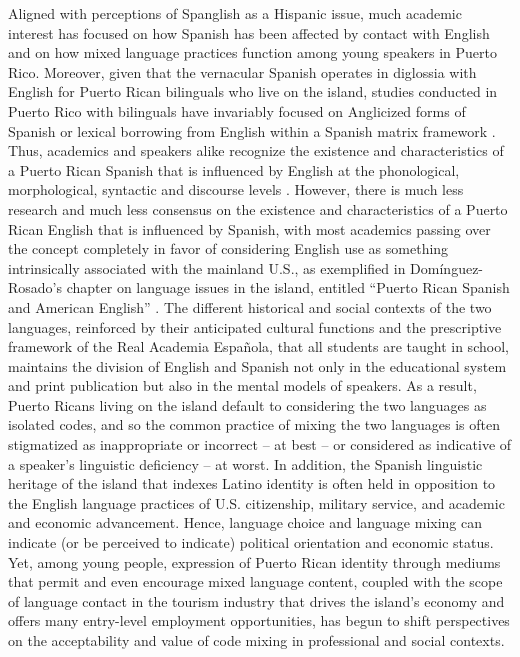 \documentclass[output=paper,colorlinks,citecolor=brown]{langscibook}
\begin{document}
Aligned with perceptions of Spanglish as a Hispanic issue, much academic interest has focused on how Spanish has been affected by contact with English and on how mixed language practices function among young speakers in Puerto Rico. Moreover, given that the vernacular Spanish operates in diglossia with English for Puerto Rican bilinguals who live on the island, studies conducted in Puerto Rico with bilinguals have invariably focused on Anglicized forms of Spanish or lexical borrowing from English within a Spanish matrix framework \citep[e.g.][]{LopezMorales_1999,Morales_2000,Holmquist_2013}. Thus, academics and speakers alike recognize the existence and characteristics of a Puerto Rican Spanish that is influenced by English at the phonological, morphological, syntactic and discourse levels \citep[see][]{Poplack_1984,Torres_2002,Armstrong_2010,Brown_Rivas_2011}. However, there is much less research and much less consensus on the existence and characteristics of a Puerto Rican English that is influenced by Spanish, with most academics passing over the concept completely in favor of considering English use as something intrinsically associated with the mainland U.S., as exemplified in Domínguez-Rosado’s chapter on language issues in the island, entitled “Puerto Rican Spanish and American English” \citep[vii]{Dominguez-Rosado_2015}. The different historical and social contexts of the two languages, reinforced by their anticipated cultural functions and the prescriptive framework of the Real Academia Española, that all students are taught in school, maintains the division of English and Spanish not only in the educational system and print publication but also in the mental models of speakers. As a result, Puerto Ricans living on the island default to considering the two languages as isolated codes, and so the common practice of mixing the two languages is often stigmatized as inappropriate or incorrect -- at best -- or considered as indicative of a speaker’s linguistic deficiency -- at worst. In addition, the Spanish linguistic heritage of the island that indexes Latino identity is often held in opposition to the English language practices of U.S. citizenship, military service, and academic and economic advancement. Hence, language choice and language mixing can indicate (or be perceived to indicate) political orientation and economic status. Yet, among young people, expression of Puerto Rican identity through mediums that permit and even encourage mixed language content, coupled with the scope of language contact in the tourism industry that drives the island’s economy and offers many entry-level employment opportunities, has begun to shift perspectives on the acceptability and value of code mixing in professional and social contexts. 
\end{document}
